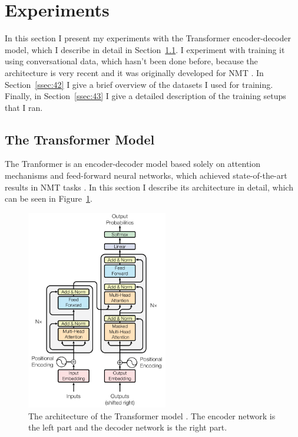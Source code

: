 \documentclass[12pt]{article}
\begin{document}
\newpage\section{Experiments} \label{sec:experiments}
In this section I present my experiments with the Transformer encoder-decoder model, which I describe in detail in Section~\ref{ssec:41}. I experiment with training it using conversational data, which hasn't been done before, because the architecture is very recent and it was originally developed for NMT \cite{Vaswani:2017}. In Section~\ref{ssec:42} I give a brief overview of the datasets I used for training. Finally, in Section~\ref{ssec:43} I give a detailed description of the training setups that I ran.
\subsection{The Transformer Model} \label{ssec:41}
The Tranformer is an encoder-decoder model based solely on attention mechanisms and feed-forward neural networks, which achieved state-of-the-art results in NMT tasks \cite{Vaswani:2017}. In this section I describe its architecture in detail, which can be seen in Figure~\ref{fig:transformer}.
\begin{figure}[H] 
	\centering
	\includegraphics[width=0.55\textwidth]{pics/transformer.png}
	\caption{The architecture of the Transformer model \cite{Vaswani:2017}. The encoder network is the left part and the decoder network is the right part.}
	\label{fig:transformer}
\end{figure}
\end{document}
